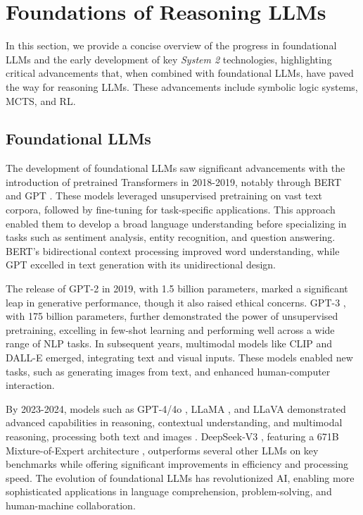 
\section{Foundations of Reasoning LLMs}\label{early_srs}



In this section, we provide a concise overview of the progress in foundational LLMs and the early development of key \textit{System 2} technologies, highlighting critical advancements that, when combined with foundational LLMs, have paved the way for reasoning LLMs. These advancements include symbolic logic systems, MCTS, and RL.


\subsection{Foundational LLMs}\label{f_llm}


The development of foundational LLMs saw significant advancements with the introduction of pretrained Transformers \cite{vaswani2017attention} in 2018-2019, notably through BERT \cite{DBLP:conf/naacl/DevlinCLT19} and GPT \cite{radford2018improving}. 
These models leveraged unsupervised pretraining on vast text corpora, followed by fine-tuning for task-specific applications. This approach enabled them to develop a broad language understanding before specializing in tasks such as sentiment analysis, entity recognition, and question answering. 
BERT's bidirectional context processing improved word understanding, while GPT excelled in text generation with its unidirectional design.

The release of GPT-2 \cite{radford2019language} in 2019, with 1.5 billion parameters, marked a significant leap in generative performance, though it also raised ethical concerns. 
GPT-3 \cite{brown2020language}, with 175 billion parameters, further demonstrated the power of unsupervised pretraining, excelling in few-shot learning and performing well across a wide range of NLP tasks. 
In subsequent years, multimodal models like CLIP \cite{radford2021learning} and DALL-E \cite{ramesh2021zero} emerged, integrating text and visual inputs. 
These models enabled new tasks, such as generating images from text, and enhanced human-computer interaction.


By 2023-2024, models such as GPT-4/4o \cite{openai2023gpt4,gpt4o-0513}, LLaMA \cite{touvron2023llama}, and LLaVA \cite{liu2023llava} demonstrated advanced capabilities in reasoning, contextual understanding, and multimodal reasoning, processing both text and images \cite{alayrac2022flamingo, DBLP:conf/icml/0008LSH23, DBLP:journals/corr/abs-2305-06500}. 
DeepSeek-V3 \cite{liu2024deepseek}, featuring a 671B Mixture-of-Expert architecture \cite{he2021fastmoe, du2022glam, dai2024deepseekmoe}, outperforms several other LLMs on key benchmarks while offering significant improvements in efficiency and processing speed. 
The evolution of foundational LLMs has revolutionized AI, enabling more sophisticated applications in language comprehension, problem-solving, and human-machine collaboration.



